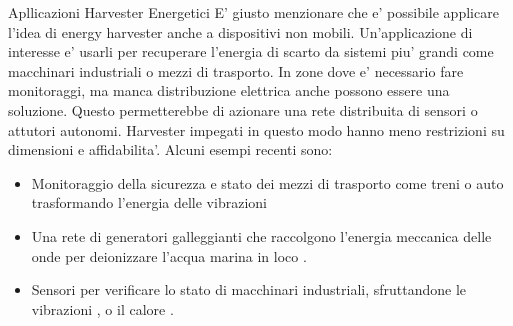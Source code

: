 \begin{section}{Apllicazioni Harvester Energetici}
    E' giusto menzionare che e' possibile applicare l'idea di energy harvester anche a dispositivi non mobili. Un'applicazione di interesse e' usarli per recuperare l'energia di scarto da sistemi piu' grandi come macchinari industriali o mezzi di trasporto. In zone dove e' necessario fare monitoraggi, ma manca distribuzione elettrica anche possono essere una soluzione. Questo permetterebbe di azionare una rete distribuita di sensori o attutori autonomi. Harvester impegati in questo modo hanno meno restrizioni su dimensioni e affidabilita'. Alcuni esempi recenti sono: \begin{itemize}
        \item Monitoraggio della sicurezza e stato dei mezzi di trasporto come treni o auto trasformando l'energia delle vibrazioni \cite{liSmartRailwayTransportation, liuCompactHybridizedTriboelectricelectromagnetic2024}
        \item Una rete di generatori galleggianti che raccolgono l'energia meccanica delle onde per deionizzare l'acqua marina in loco \cite{renWavepoweredCapacitiveDeionization2024}. 
        \item Sensori per verificare lo stato di macchinari industriali, sfruttandone le vibrazioni \cite{alvarezruedaVibrationEnergyHarvesting2024, gaoHybridGeneratorEfficient2024}, o il calore \cite{deoliveiraDevelopmentHybridEnergy2024}.
    \end{itemize}
    
\end{section}
